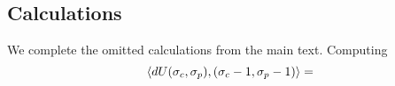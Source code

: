 \subsection{Calculations}
\label{appendix:calculations}
We complete the omitted calculations from the main text. Computing
\begin{equation}
  \left \langle dU(\sigma_c,\sigma_p),(\sigma_c-1, \sigma_p-1) \right \rangle =
\end{equation}
